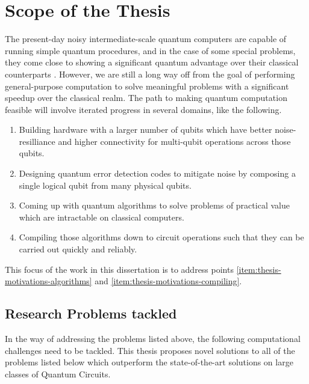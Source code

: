 \section{Scope of the Thesis}

The present-day noisy intermediate-scale quantum computers are capable of running simple quantum procedures, and in the case of some special problems, they come close to showing a significant quantum advantage over their classical counterparts \cite{google-quantum-supremacy}. However, we are still a long way off from the goal of performing general-purpose computation to solve meaningful problems with a significant speedup over the classical realm. The path to making quantum computation feasible will involve iterated progress in several domains, like the following. 
\begin{enumerate}
    \item Building hardware with a larger number of qubits which have better noise-resilliance and higher connectivity for multi-qubit operations across those qubits. 
    \item Designing quantum error detection codes to mitigate noise by composing a single logical qubit from many physical qubits.
    \item \label{item:thesis-motivations-algorithms} Coming up with quantum algorithms to solve problems of practical value which are intractable on classical computers.
    \item \label{item:thesis-motivations-compiling} Compiling those algorithms down to circuit operations such that they can be carried out quickly and reliably.
\end{enumerate}

This focus of the work in this dissertation is to address points \ref{item:thesis-motivations-algorithms} and \ref{item:thesis-motivations-compiling}.

\subsection{Research Problems tackled}

In the way of addressing the problems listed above, the following computational challenges need to be tackled. This thesis proposes novel solutions to all of the problems listed below which outperform the state-of-the-art solutions on large classes of Quantum Circuits.

